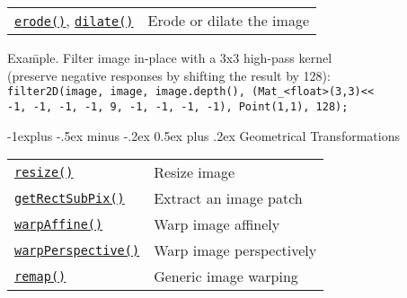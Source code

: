 \documentclass[10pt,landscape]{article}
\makeatletter
\renewcommand{\subsection}{\@startsection{subsection}{2}{0mm}%
                                {-1explus -.5ex minus -.2ex}%
                                {0.5ex plus .2ex}%
                                {\normalfont\normalsize\bfseries}}
\makeatother
\begin{document}
\begin{multicols}{3}
\begin{tabular}{@{}p{\the\MyLen}%
                @{}p{\linewidth-\the\MyLen}@{}}
\texttt{\href{http://opencv.willowgarage.com/documentation/cpp/imgproc_image_filtering.html\#cv-erode}{erode()}}, \texttt{\href{http://opencv.willowgarage.com/documentation/cpp/imgproc_image_filtering.html\#cv-dilate}{dilate()}} & Erode or dilate the image \\

\end{tabular}

\begin{tabbing}
Exa\=mple. Filter image in-place with a 3x3 high-pass kernel\\
\> (preserve negative responses by shifting the result by 128):\\
\texttt{filter2D(image, image, image.depth(), (Mat\_<float>(3,3)<<}\\
\> \texttt{-1, -1, -1, -1, 9, -1, -1, -1, -1), Point(1,1), 128);}\\
\end{tabbing}

\subsection{Geometrical Transformations}

\begin{tabular}{@{}p{\the\MyLen}%
                @{}p{\linewidth-\the\MyLen}@{}}
\texttt{\href{http://opencv.willowgarage.com/documentation/cpp/imgproc_geometric_image_transformations.html\#cv-resize}{resize()}} & Resize image \\

\texttt{\href{http://opencv.willowgarage.com/documentation/cpp/imgproc_geometric_image_transformations.html\#cv-getrectsubpix}{getRectSubPix()}} & Extract an image patch \\

\texttt{\href{http://opencv.willowgarage.com/documentation/cpp/imgproc_geometric_image_transformations.html\#cv-warpaffine}{warpAffine()}} & Warp image affinely\\

\texttt{\href{http://opencv.willowgarage.com/documentation/cpp/imgproc_geometric_image_transformations.html\#cv-warpperspective}{warpPerspective()}} & Warp image perspectively\\

\texttt{\href{http://opencv.willowgarage.com/documentation/cpp/imgproc_geometric_image_transformations.html\#cv-remap}{remap()}} & Generic image warping\\


\end{tabular}
\end{multicols}
\end{document}
